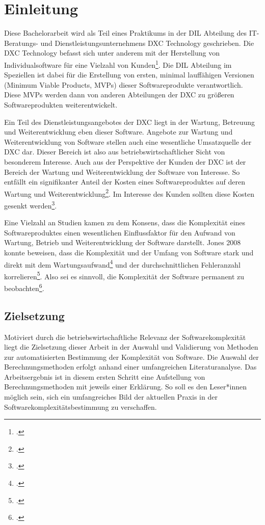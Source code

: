 \chapter{Einleitung}\label{einleitung}

Diese Bachelorarbeit wird als Teil eines Praktikums in der \ac{DIL} Abteilung des IT-Beratungs- und
Dienstleistungsunternehmens DXC Technology geschrieben. Die DXC
Technology befasst sich unter anderem mit der Herstellung von
Individualsoftware für eine Vielzahl von Kunden\footcite[Vgl. ][]{InterviewMitVertretern2022}.
Die DIL Abteilung im Speziellen ist dabei für die Erstellung von ersten,
minimal lauffähigen Versionen (Minimum Viable Products, MVPs) dieser
Softwareprodukte verantwortlich. Diese MVPs werden dann von anderen
Abteilungen der DXC zu grö\ss eren Softwareprodukten weiterentwickelt.

Ein Teil des Dienstleistungsangebotes der DXC liegt in der Wartung,
Betreuung und Weiterentwicklung eben dieser Software. Angebote zur
Wartung und Weiterentwicklung von Software stellen auch eine wesentliche
Umsatzquelle der DXC dar. Dieser Bereich ist also aus
betriebswirtschaftlicher Sicht von besonderem Interesse. Auch aus der
Perspektive der Kunden der DXC ist der Bereich der Wartung und
Weiterentwicklung der Software von Interesse. So entfällt ein
signifikanter Anteil der Kosten eines Softwareproduktes auf deren
Wartung und Weiterentwicklung\footcite[Vgl. ][S. 301]{jonesAppliedSoftwareMeasurement2008}. Im Interesse des
Kunden sollten diese Kosten gesenkt werden\footcite[Vgl. ][]{InterviewMitMitarbeiterin2022}.

Eine Vielzahl an Studien kamen zu dem Konsens, dass die Komplexität
eines Softwareproduktes einen wesentlichen Einflussfaktor für den
Aufwand von Wartung, Betrieb und Weiterentwicklung der Software
darstellt. Jones 2008 konnte beweisen, dass die Komplexität und der
Umfang von Software stark und direkt mit dem Wartungsaufwand\footcite[Vgl. ][S. 64, 335 und 627]{jonesAppliedSoftwareMeasurement2008} und der durchschnittlichen Fehleranzahl
korrelieren\footcite[Vgl. ][S. 64 und 503]{jonesAppliedSoftwareMeasurement2008}. Also sei es sinnvoll,
die Komplexität der Software permanent zu beobachten\footcite[Vgl. ][S. 503]{jonesAppliedSoftwareMeasurement2008}.

\section{Zielsetzung}\label{zielsetzung}

Motiviert durch die betriebswirtschaftliche Relevanz der
Softwarekomplexität liegt die Zielsetzung dieser Arbeit in der Auswahl
und Validierung von Methoden zur automatisierten Bestimmung der
Komplexität von Software. Die Auswahl der Berechnungsmethoden erfolgt
anhand einer umfangreichen Literaturanalyse. Das Arbeitsergebnis ist in
diesem ersten Schritt eine Aufstellung von Berechnungsmethoden mit
jeweils einer Erklärung. So soll es den Leser*innen möglich sein, sich
ein umfangreiches Bild der aktuellen Praxis in der
Softwarekomplexitätsbestimmung zu verschaffen.

